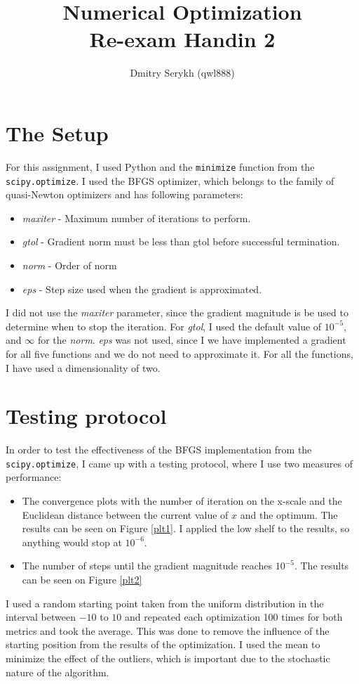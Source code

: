 \documentclass[a4paper]{article}
\title{\vspace{-5cm} Numerical Optimization \\ Re-exam Handin 2}
\author{Dmitry Serykh (qwl888)}
\begin{document}
\maketitle
\section{The Setup}
For this assignment, I used Python and the \texttt{minimize} function from the
\texttt{scipy.optimize}. I used the BFGS optimizer, which belongs to the family
of quasi-Newton optimizers and has following parameters:
\begin{itemize}
\item \emph{maxiter} - Maximum number of iterations to perform.
\item \emph{gtol} - Gradient norm must be less than gtol before successful termination.
\item \emph{norm} - Order of norm
\item \emph{eps} - Step size used when the gradient is approximated.
\end{itemize}
I did not use the \emph{maxiter} parameter, since the gradient magnitude is be used to determine 
when to stop the iteration. For \emph{gtol}, I used the default value of $10^{-5}$, and $\infty$ for
the \emph{norm}. \emph{eps} was not used, since I we have implemented a gradient
for all five functions and we do not need to approximate it.
For all the functions, I have used a dimensionality of two.

\section{Testing protocol}
In order to test the effectiveness of the BFGS implementation from the
\texttt{scipy.optimize}, I came up with a testing protocol, where I use
two measures of performance:
\begin{itemize}
\item The convergence plots with the number of iteration on the x-scale and the
  Euclidean distance between the current value of $x$ and the
  optimum. The results can be seen on Figure \ref{plt1}. I applied the low shelf
  to the results, so anything would stop at $10^{-6}$.
\item The number of steps until the gradient magnitude reaches $10^{-5}$. The
  results can be seen on Figure \ref{plt2}
\end{itemize}
I used a random starting point taken from the uniform distribution in the
interval between $-10$ to $10$ and repeated each optimization 100 times for both
metrics and took the average. This was done to remove the influence of the
starting position from the results of the optimization. I used the mean 
to minimize the effect of the outliers,
which is important due to the stochastic nature of the algorithm. 
\end{document}
